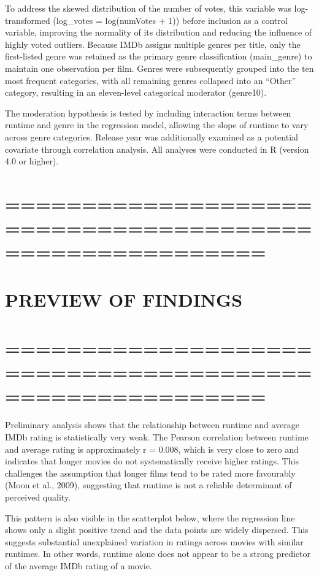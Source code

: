 \documentclass[
]{article}
\begin{document}
To address the skewed distribution of the number of votes, this variable
was log-transformed (log\_votes = log(numVotes + 1)) before inclusion as
a control variable, improving the normality of its distribution and
reducing the influence of highly voted outliers. Because IMDb assigns
multiple genres per title, only the first-listed genre was retained as
the primary genre classification (main\_genre) to maintain one
observation per film. Genres were subsequently grouped into the ten most
frequent categories, with all remaining genres collapsed into an
``Other'' category, resulting in an eleven-level categorical moderator
(genre10).

The moderation hypothesis is tested by including interaction terms
between runtime and genre in the regression model, allowing the slope of
runtime to vary across genre categories. Release year was additionally
examined as a potential covariate through correlation analysis. All
analyses were conducted in R (version 4.0 or higher).

\section{=========================================================}\label{section-8}

\section{PREVIEW OF FINDINGS}\label{preview-of-findings}

\section{=========================================================}\label{section-9}

Preliminary analysis shows that the relationship between runtime and
average IMDb rating is statistically very weak. The Pearson correlation
between runtime and average rating is approximately r = 0.008, which is
very close to zero and indicates that longer movies do not
systematically receive higher ratings. This challenges the assumption
that longer films tend to be rated more favourably (Moon et al., 2009),
suggesting that runtime is not a reliable determinant of perceived
quality.

This pattern is also visible in the scatterplot below, where the
regression line shows only a slight positive trend and the data points
are widely dispersed. This suggests substantial unexplained variation in
ratings across movies with similar runtimes. In other words, runtime
alone does not appear to be a strong predictor of the average IMDb
rating of a movie.
\end{document}
